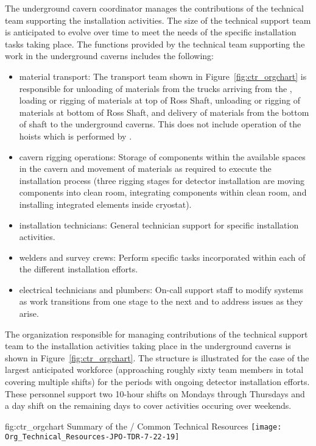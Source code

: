 The underground cavern coordinator manages the contributions of 
the technical team supporting the installation activities.
The size of the technical support team is anticipated to evolve  
over time to meet the needs of the specific installation tasks 
taking place.  The functions provided by the technical team 
supporting the work in the underground caverns includes the
following:
\begin{itemize}
  \item {material transport:} The transport team shown in
    Figure~\ref{fig:ctr_orgchart} is responsible for unloading of
    materials from the trucks arriving from the , loading
    or rigging of materials at top of Ross Shaft, unloading or rigging
    of materials at bottom of Ross Shaft, and delivery of materials
    from the bottom of shaft to the underground caverns. This does not
    include operation of the hoists which is performed by
    .
  \item {cavern rigging operations:}  Storage of 
        components within the available spaces 
        in the cavern and movement of materials as required to 
        execute the installation process (three rigging stages
        for detector installation are moving components into 
        clean room, integrating components within clean room, 
        and installing integrated elements inside cryostat).
  \item {installation technicians:}  General technician 
        support for specific installation activities. 
  \item {welders and survey crews:}  Perform 
        specific tasks incorporated within each of the different 
        installation efforts.
  \item {electrical technicians and plumbers:} On-call support staff
    to modify systems as work transitions from one stage to the next
    and to address issues as they arise.
\end{itemize}   
    
The organization responsible for managing contributions of 
the technical support team to the installation 
activities taking place in the underground caverns is shown 
in Figure~\ref{fig:ctr_orgchart}.  The structure is illustrated
for the case of the largest anticipated workforce (approaching 
roughly sixty team members in total covering multiple shifts) 
for the periods with ongoing detector installation efforts.
These personnel support two 10-hour shifts on Mondays through 
Thursdays and a day shift on the remaining days to cover 
activities occuring over weekends. 
\begin{dunefigure}{fig:ctr_orgchart}
  {Summary of the / Common Technical Resources}
  \texttt{[image: Org\_Technical\_Resources-JPO-TDR-7-22-19]}
\end{dunefigure}

